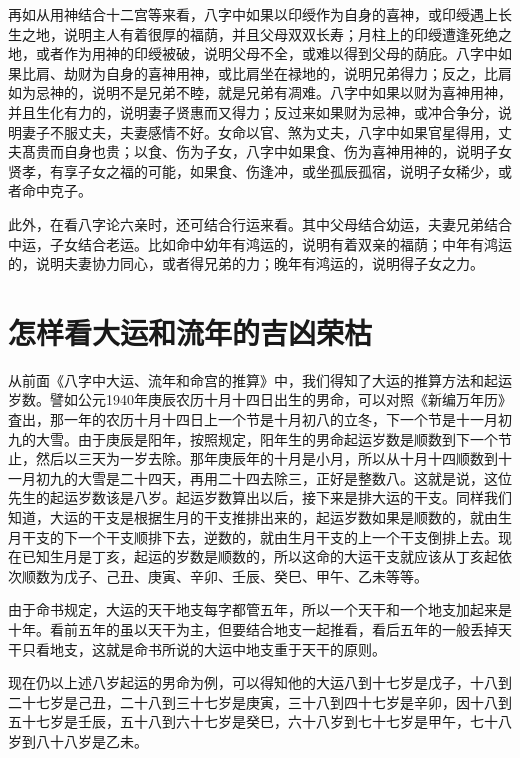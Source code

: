 \documentclass[a5paper,oneside,12pt]{ctexbook}
\begin{document}
再如从用神结合十二宫等来看，八字中如果以印绶作为自身的喜神，或印绶遇上长生之地，说明主人有着很厚的福荫，并且父母双双长寿；月柱上的印绶遭逢死绝之地，或者作为用神的印绶被破，说明父母不全，或难以得到父母的荫庇。八字中如果比肩、劫财为自身的喜神用神，或比肩坐在禄地的，说明兄弟得力；反之，比肩如为忌神的，说明不是兄弟不睦，就是兄弟有凋难。八字中如果以财为喜神用神，并且生化有力的，说明妻子贤惠而又得力；反过来如果财为忌神，或冲合争分，说明妻子不服丈夫，夫妻感情不好。女命以官、煞为丈夫，八字中如果官星得用，丈夫髙贵而自身也贵；以食、伤为子女，八字中如果食、伤为喜神用神的，说明子女贤孝，有享子女之福的可能，如果食、伤逢冲，或坐孤辰孤宿，说明子女稀少，或者命中克子。

此外，在看八字论六亲时，还可结合行运来看。其中父母结合幼运，夫妻兄弟结合中运，子女结合老运。比如命中幼年有鸿运的，说明有着双亲的福荫；中年有鸿运的，说明夫妻协力同心，或者得兄弟的力；晚年有鸿运的，说明得子女之力。

\section{怎样看大运和流年的吉凶荣枯}

从前面《八字中大运、流年和命宫的推算》中，我们得知了大运的推算方法和起运岁数。譬如公元1940年庚辰农历十月十四日出生的男命，可以对照《新编万年历》査出，那一年的农历十月十四日上一个节是十月初八的立冬，下一个节是十一月初九的大雪。由于庚辰是阳年，按照规定，阳年生的男命起运岁数是顺数到下一个节止，然后以三天为一岁去除。那年庚辰年的十月是小月，所以从十月十四顺数到十一月初九的大雪是二十四天，再用二十四去除三，正好是整数八。这就是说，这位先生的起运岁数该是八岁。起运岁数算出以后，接下来是排大运的干支。同样我们知道，大运的干支是根据生月的干支推排出来的，起运岁数如果是顺数的，就由生月干支的下一个干支顺排下去，逆数的，就由生月干支的上一个干支倒排上去。现在已知生月是丁亥，起运的岁数是顺数的，所以这命的大运干支就应该从丁亥起依次顺数为戊子、己丑、庚寅、辛卯、壬辰、癸巳、甲午、乙未等等。

由于命书规定，大运的天干地支每字都管五年，所以一个天干和一个地支加起来是十年。看前五年的虽以天干为主，但要结合地支一起推看，看后五年的一般丢掉天干只看地支，这就是命书所说的大运中地支重于天干的原则。

现在仍以上述八岁起运的男命为例，可以得知他的大运八到十七岁是戊子，十八到二十七岁是己丑，二十八到三十七岁是庚寅，三十八到四十七岁是辛卯，因十八到五十七岁是壬辰，五十八到六十七岁是癸巳，六十八岁到七十七岁是甲午，七十八岁到八十八岁是乙未。
\end{document}
